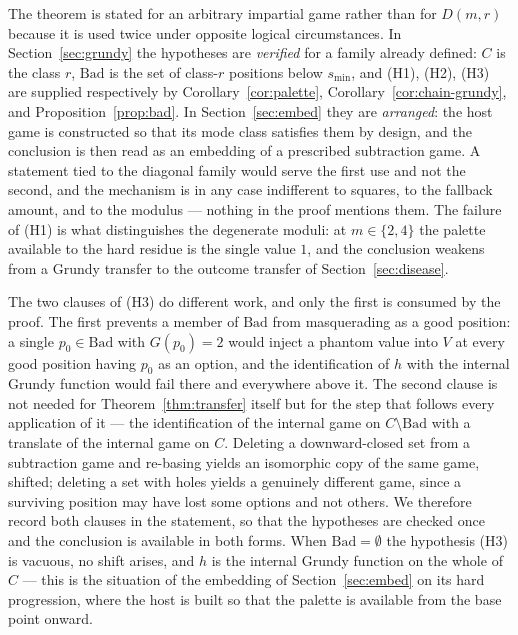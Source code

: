 \begin{remark}\label{rem:transfer-twice}
The theorem is stated for an arbitrary impartial game rather than for
$D(m,r)$ because it is used twice under opposite logical circumstances.
In Section~\ref{sec:grundy} the hypotheses are \emph{verified} for a family already
defined: $C$ is the class $r$, $\mathrm{Bad}$ is the set of class-$r$
positions below $s_{\min}$, and (H1), (H2), (H3) are supplied
respectively by Corollary~\ref{cor:palette},
Corollary~\ref{cor:chain-grundy}, and Proposition~\ref{prop:bad}. In
Section~\ref{sec:embed} they are \emph{arranged}: the host game is constructed so that
its mode class satisfies them by design, and the conclusion is then read
as an embedding of a prescribed subtraction game. A statement tied to the
diagonal family would serve the first use and not the second, and the
mechanism is in any case indifferent to squares, to the fallback amount,
and to the modulus --- nothing in the proof mentions them. The failure of
(H1) is what distinguishes the degenerate moduli: at $m \in \{2, 4\}$ the
palette available to the hard residue is the single value $1$, and the
conclusion weakens from a Grundy transfer to the outcome transfer of
Section~\ref{sec:disease}.
\end{remark}

\begin{remark}\label{rem:h3-clauses}
The two clauses of (H3) do different work, and only the first is consumed
by the proof. The first prevents a member of $\mathrm{Bad}$ from
masquerading as a good position: a single $p_0 \in \mathrm{Bad}$ with
$G(p_0) = 2$ would inject a phantom value into $V$ at every good position
having $p_0$ as an option, and the identification of $h$ with the
internal Grundy function would fail there and everywhere above it. The
second clause is not needed for Theorem~\ref{thm:transfer} itself but for
the step that follows every application of it --- the identification of
the internal game on $C \setminus \mathrm{Bad}$ with a translate of the
internal game on $C$. Deleting a downward-closed set from a subtraction
game and re-basing yields an isomorphic copy of the same game, shifted;
deleting a set with holes yields a genuinely different game, since a
surviving position may have lost some options and not others. We
therefore record both clauses in the statement, so that the hypotheses
are checked once and the conclusion is available in both forms. When
$\mathrm{Bad} = \emptyset$ the hypothesis (H3) is vacuous, no shift
arises, and $h$ is the internal Grundy function on the whole of $C$ ---
this is the situation of the embedding of Section~\ref{sec:embed} on its hard
progression, where the host is built so that the palette is available
from the base point onward.
\end{remark}

